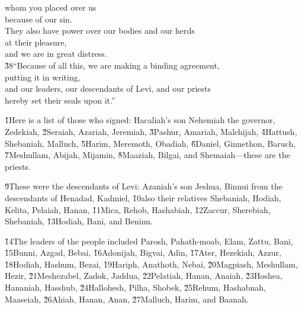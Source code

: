 \begin{poetry}
\poemll    whom you placed over us \\
\poemlll       because of our sin. \\
\poeml They also have power over our bodies and our herds \\
\poemll    at their pleasure, \\
\poemlll       and we are in great distress. \\
\poeml \v{38}``Because of all this, we are making a binding agreement, \\
\poemll    putting it in writing, \\
\poeml and our leaders, our descendants of Levi, and our priests \\
\poemll    hereby set their seals upon it.''
\end{poetry}

\v{1}Here is a list of those who signed: Hacaliah's son Nehemiah the governor, Zedekiah, \v{2}Seraiah, Azariah, Jeremiah, \v{3}Pashur, Amariah, Malchijah, \v{4}Hattush, Shebaniah, Malluch, \v{5}Harim, Meremoth, Obadiah, \v{6}Daniel, Ginnethon, Baruch, \v{7}Meshullam, Abijah, Mijamin, \v{8}Maaziah, Bilgai, and Shemaiah---these are the priests.

\v{9}These were the descendants of Levi: Azaniah's son Jeshua, Binnui from the descendants of Henadad, Kadmiel, \v{10}also their relatives Shebaniah, Hodiah, Kelita, Pelaiah, Hanan, \v{11}Mica, Rehob, Hashabiah, \v{12}Zaccur, Sherebiah, Shebaniah, \v{13}Hodiah, Bani, and Beninu.

\v{14}The leaders of the people included Parosh, Pahath-moab, Elam, Zattu, Bani, \v{15}Bunni, Azgad, Bebai, \v{16}Adonijah, Bigvai, Adin, \v{17}Ater, Hezekiah, Azzur, \v{18}Hodiah, Hashum, Bezai, \v{19}Hariph, Anathoth, Nebai, \v{20}Magpiash, Meshullam, Hezir, \v{21}Meshezabel, Zadok, Jaddua, \v{22}Pelatiah, Hanan, Anaiah, \v{23}Hoshea, Hananiah, Hasshub, \v{24}Hallohesh, Pilha, Shobek, \v{25}Rehum, Hashabnah, Maaseiah, \v{26}Ahiah, Hanan, Anan, \v{27}Malluch, Harim, and Baanah.

